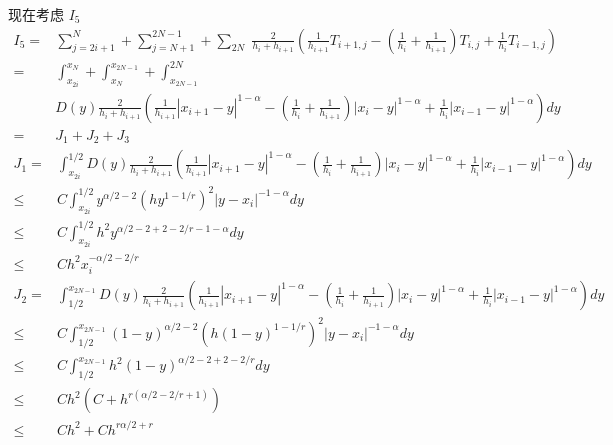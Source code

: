 \documentclass{ctexart}
\begin{document}
现在考虑 \(I_5\)
\begin{equation}
    \begin{aligned}
        I_5 = & \sum_{j=2i+1}^{N} + \sum_{j=N+1}^{2N-1} + \sum_{2N} \; \frac{2}{h_i + h_{i+1}}
        \left( \frac{1}{h_{i+1}} T_{i+1, j} - (\frac{1}{h_{i}}+\frac{1}{h_{i+1}}) T_{i,j} + \frac{1}{h_{i}} T_{i-1, j} \right) \\
        =     & \int_{x_{2i}}^{x_{N}} +\int_{x_{N}}^{x_{2N-1}} + \int_{x_{2N-1}}^{2N}                                          \\
              & D(y) \frac{2}{h_i + h_{i+1}}
        ( \frac{1}{h_{i+1}} |x_{i+1}-y|^{1-\alpha}
        - (\frac{1}{h_{i}}+\frac{1}{h_{i+1}}) |x_{i}-y|^{1-\alpha}
        +  \frac{1}{h_{i}}|x_{i-1}-y|^{1-\alpha} )  dy                                                                         \\
        =     & J_1 + J_2 + J_3
    \end{aligned}
\end{equation}
\begin{equation}
    \begin{aligned}
        J_1 = & \int_{x_{2i}}^{1/2}
        D(y) \frac{2}{h_i + h_{i+1}}
        ( \frac{1}{h_{i+1}} |x_{i+1}-y|^{1-\alpha}
        - (\frac{1}{h_{i}}+\frac{1}{h_{i+1}}) |x_{i}-y|^{1-\alpha}
        +  \frac{1}{h_{i}}|x_{i-1}-y|^{1-\alpha} )  dy                                     \\
        \le   & C \int_{x_{2i}}^{1/2} y^{\alpha/2-2} (hy^{1-1/r})^2 |y-x_i|^{-1-\alpha} dy \\
        \le   & C \int_{x_{2i}}^{1/2} h^2 y^{\alpha/2-2 + 2-2/r -1-\alpha} dy              \\
        \le   & C h^2 x_i^{-\alpha/2-2/r}
    \end{aligned}
\end{equation}
\begin{equation}
    \begin{aligned}
        J_2 = & \int_{1/2}^{x_{2N-1}}
        D(y) \frac{2}{h_i + h_{i+1}}
        ( \frac{1}{h_{i+1}} |x_{i+1}-y|^{1-\alpha}
        - (\frac{1}{h_{i}}+\frac{1}{h_{i+1}}) |x_{i}-y|^{1-\alpha}
        +  \frac{1}{h_{i}}|x_{i-1}-y|^{1-\alpha} )  dy                                               \\
        \le   & C \int_{1/2}^{x_{2N-1}} (1-y)^{\alpha/2-2} (h(1-y)^{1-1/r})^2 |y-x_i|^{-1-\alpha} dy \\
        \le   & C \int_{1/2}^{x_{2N-1}} h^2 (1-y)^{\alpha/2-2 + 2-2/r} dy                            \\
        \le   & C h^2 (C + h^{r(\alpha/2-2/r+1)})                                                    \\
        \le   & Ch^2 + C h^{r\alpha/2+r}
    \end{aligned}
\end{equation}
\end{document}
